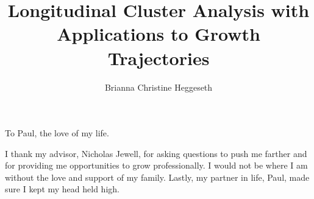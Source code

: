 \documentclass{ucbthesis}
\begin{document}

\title{Longitudinal Cluster Analysis with Applications to Growth Trajectories}
\author{Brianna Christine Heggeseth}




\maketitle
\approvalpage
\copyrightpage



\begin{frontmatter}

\begin{dedication}
\null\vfil
\begin{center}
To Paul, the love of my life.\\\vspace{12pt}

\end{center}
\vfil\null
\end{dedication}

\tableofcontents
\clearpage
\listoffigures
\clearpage
\listoftables

\begin{acknowledgements}
I thank my advisor, Nicholas Jewell, for asking questions to push me farther and for providing me opportunities to grow professionally. I would not be where I am without the love and support of my family. Lastly, my partner in life, Paul, made sure I kept my head held high.
\end{acknowledgements}

\end{frontmatter}

\pagestyle{headings}











\printbibliography

\appendix
% 
%
%
\end{document}
